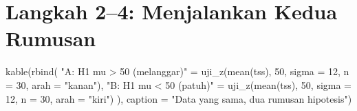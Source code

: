 \documentclass[
  indonesian,
  letterpaper,
]{book}
\newenvironment{Shaded}{\begin{snugshade}}{\end{snugshade}}
\newcommand{\AttributeTok}[1]{\textcolor[rgb]{0.40,0.45,0.13}{#1}}
\newcommand{\DecValTok}[1]{\textcolor[rgb]{0.68,0.00,0.00}{#1}}
\newcommand{\FunctionTok}[1]{\textcolor[rgb]{0.28,0.35,0.67}{#1}}
\newcommand{\NormalTok}[1]{\textcolor[rgb]{0.00,0.23,0.31}{#1}}
\newcommand{\OtherTok}[1]{\textcolor[rgb]{0.00,0.23,0.31}{#1}}
\newcommand{\StringTok}[1]{\textcolor[rgb]{0.13,0.47,0.30}{#1}}
\begin{document}
\section{Langkah 2--4: Menjalankan Kedua
Rumusan}\label{langkah-24-menjalankan-kedua-rumusan}

\begin{Shaded}
\begin{Highlighting}[]
\FunctionTok{kable}\NormalTok{(}\FunctionTok{rbind}\NormalTok{(}
  \StringTok{"A: H1 mu \textgreater{} 50 (melanggar)"} \OtherTok{=} \FunctionTok{uji\_z}\NormalTok{(}\FunctionTok{mean}\NormalTok{(tss), }\DecValTok{50}\NormalTok{, }\AttributeTok{sigma =} \DecValTok{12}\NormalTok{, }\AttributeTok{n =} \DecValTok{30}\NormalTok{, }\AttributeTok{arah =} \StringTok{"kanan"}\NormalTok{),}
  \StringTok{"B: H1 mu \textless{} 50 (patuh)"}     \OtherTok{=} \FunctionTok{uji\_z}\NormalTok{(}\FunctionTok{mean}\NormalTok{(tss), }\DecValTok{50}\NormalTok{, }\AttributeTok{sigma =} \DecValTok{12}\NormalTok{, }\AttributeTok{n =} \DecValTok{30}\NormalTok{, }\AttributeTok{arah =} \StringTok{"kiri"}\NormalTok{)}
\NormalTok{), }\AttributeTok{caption =} \StringTok{"Data yang sama, dua rumusan hipotesis"}\NormalTok{)}
\end{Highlighting}
\end{Shaded}
\end{document}
